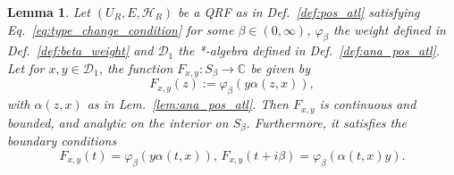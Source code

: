 \documentclass[sn-mathphys-num]{sn-jnl}%
\newcommand{\CC}{\mathbb{C}}
\newcommand{\HH}{\mathcal{H}}
\numberwithin{equation}{section}
\theoremstyle{thmstyleone}%
\newtheorem{lemma}[theorem]{Lemma}
\theoremstyle{thmstyletwo}%
\theoremstyle{thmstylethree}%
\begin{document}
\begin{lemma}
    \label{lem:KMS_F_int}
    Let $(U_R,E,\HH_R)$ be a QRF as in Def.\ \ref{def:pos_atl} satisfying Eq.\ \eqref{eq:type_change_condition} for some $\beta\in(0,\infty)$, $\varphi_\beta$ the weight defined in Def.\ \ref{def:beta_weight} and $\mathcal{D}_1$ the *-algebra defined in Def.\ \ref{def:ana_pos_atl}. Let for $x,y\in\mathcal{D}_1$, the function $F_{x,y}:S_\beta\to \CC$ be given by
    \begin{equation}
        F_{x,y}(z):=\varphi_\beta(y\alpha(z,x)),
    \end{equation}
    with $\alpha(z,x)$ as in Lem.\ \ref{lem:ana_pos_atl}. Then $F_{x,y}$ is continuous and bounded, and analytic on the interior on $S_\beta$. Furthermore, it satisfies the boundary conditions
\begin{equation}
    F_{x,y}(t)=\varphi_\beta(y\alpha(t,x)),\, F_{x,y}(t+i\beta)=\varphi_\beta(\alpha(t,x)y).
\end{equation}
\end{lemma}
\end{document}
